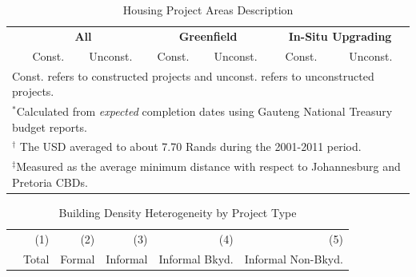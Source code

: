 \documentclass[12pt]{article}
\begin{document}
\vspace{0mm}
\begin{table}[h!]
\centering
\caption{Housing Project Areas Description}\label{table:projectdescriptives}
\vspace{0mm}
\begin{tabular}{l*{1}{cccccc}}
\toprule
  & \multicolumn{2}{c}{\textbf{All}}& \multicolumn{2}{c}{\textbf{Greenfield}}  & \multicolumn{2}{c}{\textbf{In-Situ Upgrading}}   \\
  &Const. & Unconst. &Const. & Unconst.   & Const. & Unconst. \\
\midrule

\bottomrule
\multicolumn{7}{l}{\scriptsize Const. refers to constructed projects and unconst. refers to unconstructed projects.}\\[-.5em]
\multicolumn{7}{l}{\scriptsize $^*$Calculated from {\it expected} completion dates using Gauteng National Treasury budget reports.}\\[-.5em]
\multicolumn{7}{l}{\scriptsize $^\dagger$ The USD averaged to about 7.70 Rands during the 2001-2011 period.}\\[-.5em]
\multicolumn{7}{l}{\scriptsize $^\ddagger$Measured as the average minimum distance with respect to Johannesburg and Pretoria CBDs. } \\[-.5em]
\end{tabular}
\end{table} 



\begin{table}
\caption{Building Density Heterogeneity by Project Type}
\begin{tabular}{lDDDDD}
\toprule
 & \small (1) & \small (2)  & \small (3) & \small (4) & \small (5) \\
 & Total & Formal  & Informal & Informal Bkyd. & Informal Non-Bkyd. \\
  \midrule

\bottomrule
\end{tabular}
\end{table}
\end{document}
